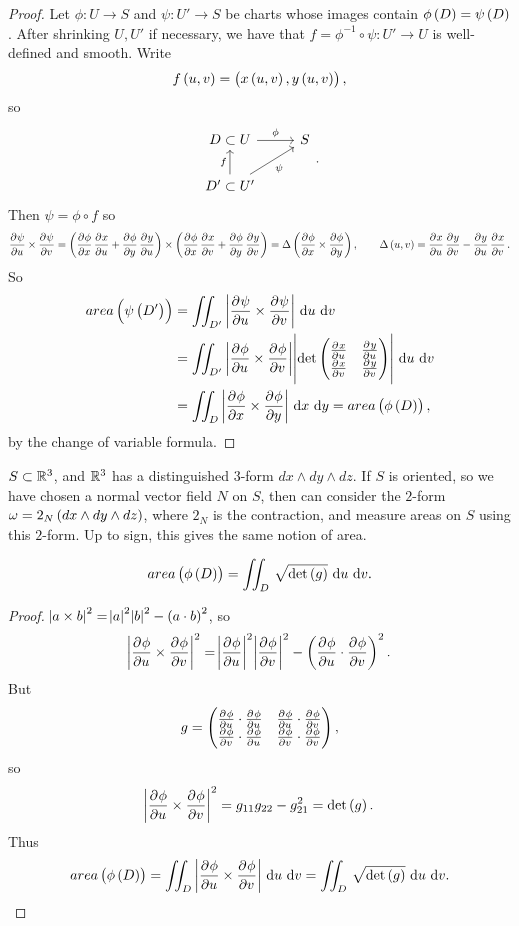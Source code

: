\begin{proof}
Let $ \phi : U \to S $ and $ \psi : U' \to S $ be charts whose images contain $ \phi\br{D} = \psi\br{D} $. After shrinking $ U, U' $ if necessary, we have that $ f = \phi^{-1} \circ \psi : U' \to U $ is well-defined and smooth. Write
$$ f\br{u, v} = \br{x\br{u, v}, y\br{u, v}}, $$
so
$$
\begin{tikzcd}
D \subset U \arrow{r}{\phi} & S \\
D' \subset U' \arrow{u}{f} \arrow[swap]{ur}{\psi} &
\end{tikzcd}.
$$
Then $ \psi = \phi \circ f $ so
$$ \dpd{\psi}{u} \times \dpd{\psi}{v} = \br{\dpd{\phi}{x}\dpd{x}{u} + \dpd{\phi}{y}\dpd{y}{u}} \times \br{\dpd{\phi}{x}\dpd{x}{v} + \dpd{\phi}{y}\dpd{y}{v}} = \Delta\br{\dpd{\phi}{x} \times \dpd{\phi}{y}}, \qquad \Delta\br{u, v} = \dpd{x}{u}\dpd{y}{v} - \dpd{y}{u}\dpd{x}{v}. $$
So
\begin{align*}
area\br{\psi\br{D'}}
& = \iintd{D'}{\abs{\dpd{\psi}{u} \times \dpd{\psi}{v}}}{u}{v} \\
& = \iintd{D'}{\abs{\dpd{\phi}{u} \times \dpd{\phi}{v}}\abs{\det\twobytwo{\tpd{x}{u}}{\tpd{y}{u}}{\tpd{x}{v}}{\tpd{y}{v}}}}{u}{v} \\
& = \iintd{D}{\abs{\dpd{\phi}{x} \times \dpd{\phi}{y}}}{x}{y}
= area\br{\phi\br{D}},
\end{align*}
by the change of variable formula.
\end{proof}

\begin{note*}
$ S \subset \mathbb{R}^3 $, and $ \mathbb{R}^3 $ has a distinguished $ 3 $-form $ dx \wedge dy \wedge dz $. If $ S $ is oriented, so we have chosen a normal vector field $ N $ on $ S $, then can consider the $ 2 $-form $ \omega = 2_N\br{dx \wedge dy \wedge dz} $, where $ 2_N $ is the contraction, and measure areas on $ S $ using this $ 2 $-form. Up to sign, this gives the same notion of area.
\end{note*}

\pagebreak

\begin{lemma}
$$ area\br{\phi\br{D}} = \iintd{D}{\sqrt{\det\br{g}}}{u}{v}. $$
\end{lemma}

\begin{proof}
$ \abs{a \times b}^2 = \abs{a}^2\abs{b}^2 - \br{a \cdot b}^2 $, so
$$ \abs{\dpd{\phi}{u} \times \dpd{\phi}{v}}^2 = \abs{\dpd{\phi}{u}}^2\abs{\dpd{\phi}{v}}^2 - \br{\dpd{\phi}{u} \cdot \dpd{\phi}{v}}^2. $$
But
$$ g = \twobytwo{\tpd{\phi}{u} \cdot \tpd{\phi}{u}}{\tpd{\phi}{u} \cdot \tpd{\phi}{v}}{\tpd{\phi}{v} \cdot \tpd{\phi}{u}}{\tpd{\phi}{v} \cdot \tpd{\phi}{v}}, $$
so
$$ \abs{\dpd{\phi}{u} \times \dpd{\phi}{v}}^2 = g_{11}g_{22} - g_{21}^2 = \det\br{g}. $$
Thus
$$ area\br{\phi\br{D}} = \iintd{D}{\abs{\dpd{\phi}{u} \times \dpd{\phi}{v}}}{u}{v} = \iintd{D}{\sqrt{\det\br{g}}}{u}{v}. $$
\end{proof}


